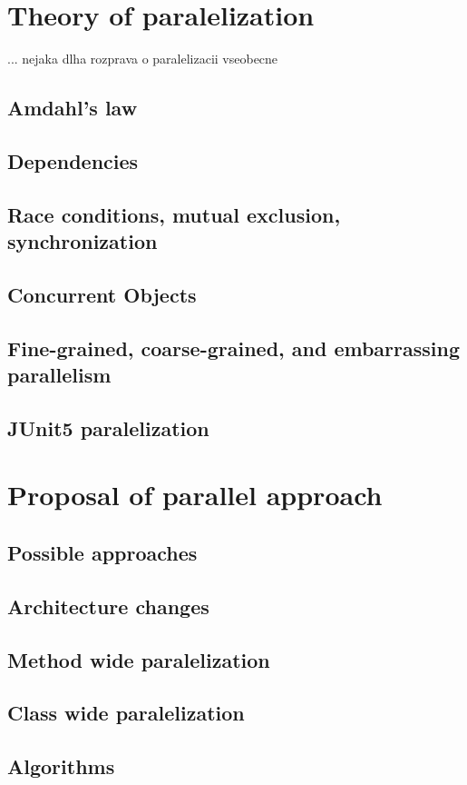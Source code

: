 \chapter{Theory of paralelization}

... nejaka dlha rozprava o paralelizacii vseobecne
\section{Amdahl's law}
\section{Dependencies}
\section{Race conditions, mutual exclusion, synchronization}
\section{Concurrent Objects}
\section{Fine-grained, coarse-grained, and embarrassing parallelism}
\section{JUnit5 paralelization}

\chapter{Proposal of parallel approach}

\section{Possible approaches}
\section{Architecture changes} %
\section{Method wide paralelization}
\section{Class wide paralelization}
\section{Algorithms} 

